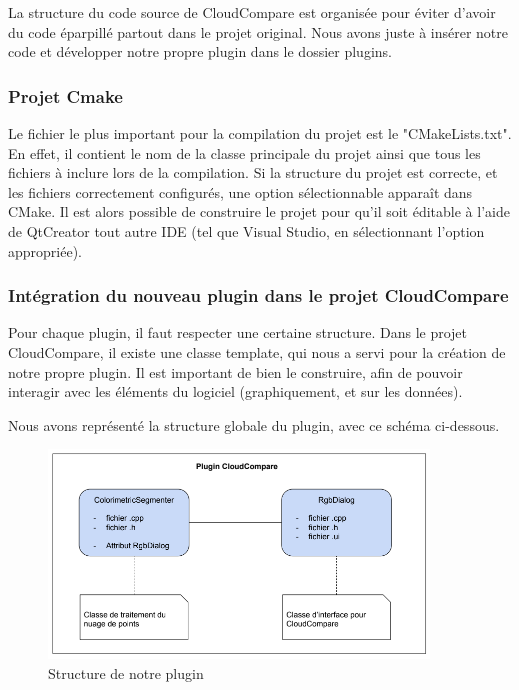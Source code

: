 \documentclass[12pt,titlepage,french]{article}
\begin{document}
La structure du code source de CloudCompare est organisée pour éviter d'avoir du code éparpillé partout dans le projet original. Nous avons juste à insérer notre code et développer notre propre plugin dans le dossier plugins.

\subsubsection{Projet Cmake}

Le fichier le plus important pour la compilation du projet est le "CMakeLists.txt". En effet, il contient le nom de la classe principale du projet ainsi que tous les fichiers à inclure lors de la compilation.
Si la structure du projet est correcte, et les fichiers correctement configurés, une option sélectionnable apparaît dans CMake.
Il est alors possible de construire le projet pour qu'il soit éditable à l'aide de QtCreator tout autre IDE (tel que Visual Studio, en sélectionnant l'option appropriée).

\subsubsection{Intégration du nouveau plugin dans le projet CloudCompare}

Pour chaque plugin, il faut respecter une certaine structure. Dans le projet CloudCompare, il existe une classe template, qui nous a servi pour la création de notre propre plugin. Il est important de bien le construire, afin de pouvoir interagir avec les éléments du logiciel (graphiquement, et sur les données). \newline

Nous avons représenté la structure globale du plugin, avec ce schéma ci-dessous.

\begin{figure}[H]
\center
  \includegraphics[width=0.9\textwidth]{./img/architecture_plugin.PNG}
  \caption{\label{} Structure de notre plugin}
\end{figure}
\end{document}
